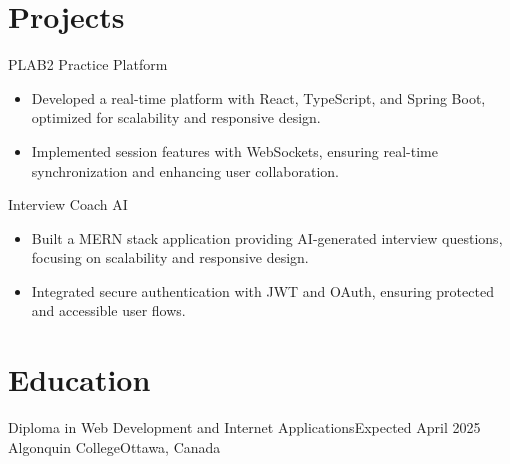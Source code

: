 \documentclass[a4paper,10pt]{article}
\begin{document}
\section*{Projects}
\resumeSubheading
{PLAB2 Practice Platform}{}
\begin{itemize}
    \item Developed a real-time platform with React, TypeScript, and Spring Boot, optimized for scalability and responsive design.
    \item Implemented session features with WebSockets, ensuring real-time synchronization and enhancing user collaboration.
\end{itemize}

\resumeSubheading
{Interview Coach AI}{}
\begin{itemize}
    \item Built a MERN stack application providing AI-generated interview questions, focusing on scalability and responsive design.
    \item Integrated secure authentication with JWT and OAuth, ensuring protected and accessible user flows.
\end{itemize}

\section*{Education}
\resumeSubheading
{Diploma in Web Development and Internet Applications}{Expected April 2025}
{Algonquin College}{Ottawa, Canada}
\end{document}
